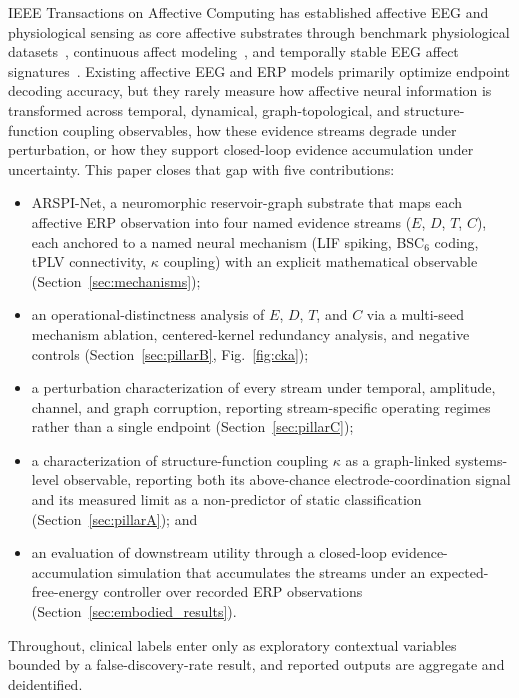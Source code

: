\documentclass[journal]{IEEEtran}
\begin{document}
IEEE Transactions on Affective Computing has established affective EEG and physiological sensing as core affective substrates through benchmark physiological datasets~\cite{koelstra2012deap,soleymani2012mahnob}, continuous affect modeling~\cite{soleymani2016continuous}, and temporally stable EEG affect signatures~\cite{zheng2019stable,alarcao2019survey}. Existing affective EEG and ERP models primarily optimize endpoint decoding accuracy, but they rarely measure how affective neural information is transformed across temporal, dynamical, graph-topological, and structure-function coupling observables, how these evidence streams degrade under perturbation, or how they support closed-loop evidence accumulation under uncertainty. This paper closes that gap with five contributions:
\begin{itemize}\setlength{\itemsep}{-1pt}
\item ARSPI-Net, a neuromorphic reservoir-graph substrate that maps each affective ERP observation into four named evidence streams ($E$, $D$, $T$, $C$), each anchored to a named neural mechanism (LIF spiking, BSC$_6$ coding, tPLV connectivity, $\kappa$ coupling) with an explicit mathematical observable (Section~\ref{sec:mechanisms});
\item an operational-distinctness analysis of $E$, $D$, $T$, and $C$ via a multi-seed mechanism ablation, centered-kernel redundancy analysis, and negative controls (Section~\ref{sec:pillarB}, Fig.~\ref{fig:cka});
\item a perturbation characterization of every stream under temporal, amplitude, channel, and graph corruption, reporting stream-specific operating regimes rather than a single endpoint (Section~\ref{sec:pillarC});
\item a characterization of structure-function coupling $\kappa$ as a graph-linked systems-level observable, reporting both its above-chance electrode-coordination signal and its measured limit as a non-predictor of static classification (Section~\ref{sec:pillarA}); and
\item an evaluation of downstream utility through a closed-loop evidence-accumulation simulation that accumulates the streams under an expected-free-energy controller over recorded ERP observations (Section~\ref{sec:embodied_results}).
\end{itemize}
Throughout, clinical labels enter only as exploratory contextual variables bounded by a false-discovery-rate result, and reported outputs are aggregate and deidentified.
\end{document}
